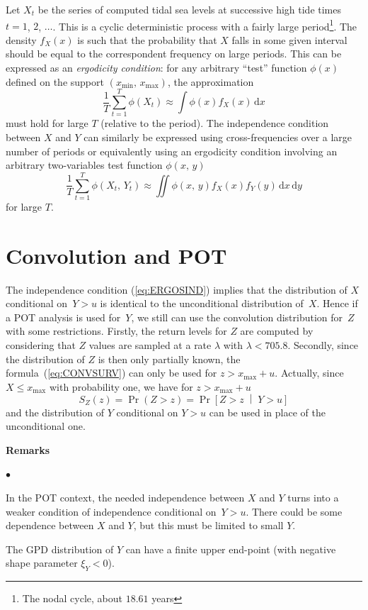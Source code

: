 \documentclass[11pt,a4paper]{report}\usepackage[]{graphicx}\usepackage[]{color}
\newcommand{\bCond}[2]{\left[ #1 \;\middle\vert\; #2 \right]}
\newcommand{\Low}[1]{#1_{\mathrm{min}}}
\newcommand{\Up}[1]{#1_{\mathrm{max}}}
\newenvironment{remarks}
   {\medskip \par \noindent%
    \textbf{Remarks}\\\vspace{-1.5em}\nopagebreak%
    \begin{list}{$\bullet$}{%
       \setlength{\labelwidth}{-6pt}%
       \setlength{\leftmargin}{0pt}%
       \setlength{\rightmargin}{0pt}%
       \small
     }
   }%
   {\end{list} \par \noindent}
\begin{document}
Let $X_t$ be the series of computed tidal sea levels at successive high tide
times~$t=1$, $2$, $\dots$. This is a cyclic deterministic process with
a fairly large period\footnote{The nodal cycle, about $18.61$ years}.
The density $f_X(x)$ is such that the probability that $X$ falls in some
given interval should be equal to the correspondent frequency on large
periods. This can be expressed as an \textit{ergodicity condition}:
 for any arbitrary ``test'' function $\phi(x)$
defined on the support $(\Low{x},\,\Up{x})$, the
approximation
\begin{equation}
  \label{eq:ERGOS}
  \frac{1}{T} \sum_{t=1}^T \phi(X_t) \approx 
  \int \phi(x)f_X(x) \, \mathrm{d}x 
\end{equation}
must hold for large $T$ (relative to the period).  The independence condition
between $X$ and $Y$ can similarly be expressed using cross-frequencies over a
large number of periods or equivalently using an ergodicity condition involving
an arbitrary two-variables test function $\phi(x,\,y)$
\begin{equation}
   \label{eq:ERGOSIND}
  \frac{1}{T} \sum_{t=1}^T \phi(X_t,\,Y_t) \approx 
  \iint \phi(x,\,y)f_X(x)f_Y(y)\, \mathrm{d}x \,\mathrm{d}y
\end{equation}
for large $T$.  

\section{Convolution and POT}
The independence condition (\ref{eq:ERGOSIND}) implies that the
distribution of $X$ conditional on~$Y>u$ is identical to the
unconditional distribution of~$X$.  Hence if a POT analysis is used
for~$Y$, we still can use the convolution distribution for~$Z$ with
some restrictions. Firstly, the return levels for $Z$ are computed by
considering that $Z$ values are sampled at a rate 
$\lambda$ with $\lambda<705.8$. Secondly,
since the distribution of $Z$ is then only partially known, the
formula~(\ref{eq:CONVSURV}) can only be used for $z > x_{\mathrm{max}}
+ u$. Actually, since $X \leqslant \Up{x}$ with probability one, we
have for $z > \Up{x} + u$
$$
   S_Z(z) = \Pr(Z>z) = \Pr\bCond{Z > z}{Y>u} 
$$
and the distribution of $Y$ conditional on $Y>u$ can 
be used in place of the unconditional one.

\begin{remarks} 
  
\item In the POT context, the needed independence between $X$ and $Y$
  turns into a weaker condition of independence conditional
  on~$Y>u$. There could be some dependence between $X$ and $Y$, but
  this must be limited to small $Y$.
  
\item The GPD distribution of $Y$ can have a finite upper end-point
  (with negative shape parameter $\xi_Y<0$).

\end{remarks}
\end{document}
